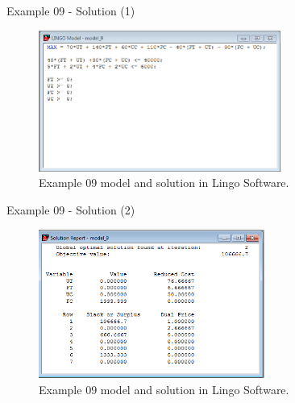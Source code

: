 \begin{frame}{Example 09 - Solution (1)}
\begin{figure}
    \includegraphics[width=300px]{slides/ex09/screenshot_a.png}
    \caption{Example 09 model and solution in Lingo Software.}
\end{figure}
\end{frame}

\begin{frame}{Example 09 - Solution (2)}
\begin{figure}
    \includegraphics[width=280px]{slides/ex09/screenshot_b.png}
    \caption{Example 09 model and solution in Lingo Software.}
\end{figure}
\end{frame}

